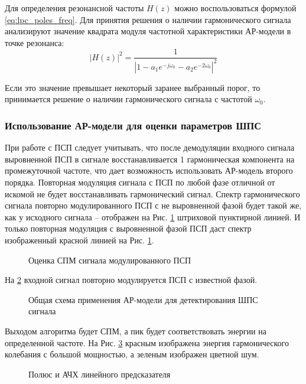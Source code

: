 Для определения резонансной частоты ${H(z)}$ можно воспользоваться формулой \ref{eq:lpc_poles_freq}.
Для принятия решения о наличии гармонического сигнала анализируют значение квадрата модуля частотной
характеристики АР-модели в точке резонанса:
\begin{equation}
	\label{eq:lpc_power_cos}
	\left| H(z) \right|^2 = \frac{1}{\left| 1 - a_1 e^{-j \omega_0} - a_2 e^{-2 \omega_0} \right|^2}
\end{equation}

Если это значение превышает некоторый заранее выбранный порог, то принимается решение о наличии гармонического
сигнала с частотой ${\omega_0}$. 

\subsubsection{Использование АР-модели для оценки параметров ШПС}
\label{ssec2:lpc_cdma_detect}

При работе с ПСП следует учитывать, что после демодуляции входного сигнала выровненной ПСП в сигнале восстанавливается 1 гармоническая
компонента на промежуточной частоте, что дает возможность использовать АР-модель второго порядка.
Повторная модуляция сигнала с ПСП по любой фазе отличной от искомой не будет восстанавливать гармонический сигнал.
Спектр гармонического сигнала повторно модулированного ПСП с не выровненной фазой будет такой же, как у исходного сигнала – отображен
на Рис. \ref{pic:lpc_psd_1} штриховой пунктирной линией. И только повторная модуляция с выровненной фазой ПСП даст спектр
изображенный красной линией на Рис. \ref{pic:lpc_psd_1}.
\begin{figure}[h]
	\center{}
	\caption{Оценка СПМ сигнала модулированного ПСП}
	\label{pic:lpc_psd_1}
\end{figure}

На \ref{pic:lpc_basic1} входной сигнал повторно модулируется ПСП с известной фазой.
\begin{figure}[h]
	\center{}
	\caption{Общая схема применения АР-модели для детектирования ШПС сигнала}
	\label{pic:lpc_basic1}
\end{figure}

Выходом алгоритма будет СПМ, а пик будет соответствовать энергии на определенной частоте. На Рис.
\ref{pic:lpc_poles_gps} красным изображена энергия гармонического колебания с большой мощностью, а
зеленым изображен цветной шум.
\begin{figure}[h]
	\center{}
	\caption{Полюс и АЧХ линейного предсказателя}
	\label{pic:lpc_poles_gps}
\end{figure}

